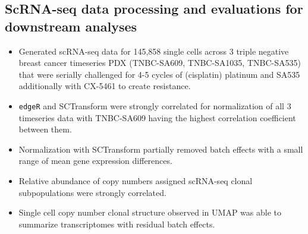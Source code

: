   \subsection{ScRNA-seq data processing and evaluations for downstream analyses} 
\begin{itemize}
  
   \item Generated scRNA-seq data for 145,858 single cells across 3 triple negative breast cancer timeseries PDX 
(TNBC-SA609, TNBC-SA1035, TNBC-SA535) that were serially challenged for 4-5 cycles of (cisplatin) platinum and SA535 additionally with CX-5461 to create resistance.
   \item \texttt{edgeR} and SCTransform were strongly correlated for normalization of all 3 timeseries data with TNBC-SA609 having the highest correlation coefficient between them.
 \item Normalization with SCTransform partially removed batch effects with a small range of mean gene expression differences.
 \item Relative abundance of copy numbers assigned scRNA-seq clonal subpopulations were strongly correlated.
 \item Single cell copy number clonal structure observed in UMAP was able to summarize transcriptomes with residual batch effects.

\end{itemize}

